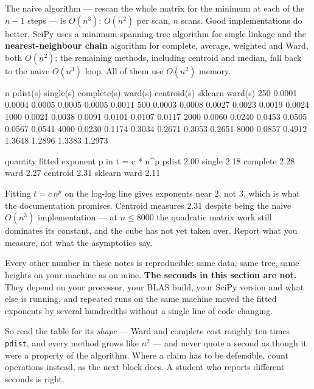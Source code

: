 \documentclass[11pt]{article}
\begin{document}
The naive algorithm --- rescan the whole matrix for the minimum at each of the
$n-1$ steps --- is $O(n^3)$: $O(n^2)$ per scan, $n$ scans. Good
implementations do better. SciPy uses a minimum-spanning-tree algorithm for
single linkage and the \textbf{nearest-neighbour chain} algorithm for
complete, average, weighted and Ward, both $O(n^2)$; the remaining methods,
including centroid and median, fall back to the naive $O(n^3)$ loop. All of
them use $O(n^2)$ memory.

\begin{codeout}
     n   pdist(s)  single(s)  complete(s)   ward(s)  centroid(s)  sklearn ward(s)
   250     0.0001     0.0004       0.0005    0.0005       0.0005          0.0011
   500     0.0003     0.0008       0.0027    0.0023       0.0019          0.0024
  1000     0.0021     0.0038       0.0091    0.0101       0.0107          0.0117
  2000     0.0060     0.0240       0.0453    0.0505       0.0567          0.0541
  4000     0.0230     0.1174       0.3034    0.2671       0.3053          0.2651
  8000     0.0857     0.4912       1.3648    1.2896       1.3383          1.2973
\end{codeout}
\begin{codeout}
  quantity        fitted exponent p in t = c * n^p
  pdist           2.00
  single          2.18
  complete        2.28
  ward            2.27
  centroid        2.31
  sklearn ward    2.11
\end{codeout}

Fitting $t = c\,n^p$ on the log-log line gives exponents near $2$, not $3$,
which is what the documentation promises. Centroid measures $2.31$ despite
being the naive $O(n^3)$ implementation --- at $n \le 8000$ the quadratic
matrix work still dominates its constant, and the cube has not yet taken over.
Report what you measure, not what the asymptotics say.

\begin{caution}
Every other number in these notes is reproducible: same data, same tree, same
heights on your machine as on mine. \textbf{The seconds in this section are
not.} They depend on your processor, your BLAS build, your SciPy version and
what else is running, and repeated runs on the same machine moved the fitted
exponents by several hundredths without a single line of code changing.

So read the table for its \emph{shape} --- Ward and complete cost roughly ten
times \texttt{pdist}, and every method grows like $n^2$ --- and never quote a
second as though it were a property of the algorithm. Where a claim has to be
defensible, count operations instead, as the next block does. A student who
reports different seconds is right.
\end{caution}
\end{document}
